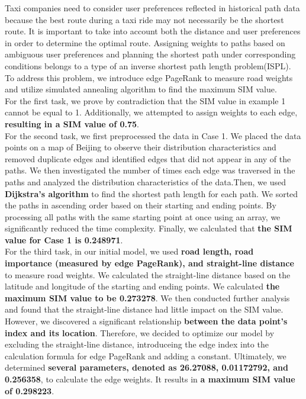 \documentclass[12pt]{article}
\begin{document}
\indent Taxi companies need to consider user preferences reflected in historical path data because the best route during a taxi ride may not necessarily be the shortest route. It is important to take into account both the distance and user preferences in order to determine the optimal route. Assigning weights to paths based on ambiguous user preferences and planning the shortest path under corresponding conditions belongs to a type of an inverse shortest path length problem(ISPL). To address this problem, we introduce edge PageRank to measure road weights and utilize simulated annealing algorithm to find the maximum SIM value.\\
\indent For the first task, we prove by contradiction that the SIM value in example 1 cannot be equal to 1. Additionally, we attempted to assign weights to each edge, \textbf{resulting in a SIM value of 0.75}.\\
\indent For the second task, we first preprocessed the data in Case 1. We placed the data points on a map of Beijing to observe their distribution characteristics and removed duplicate edges and identified edges that did not appear in any of the paths. We then investigated the number of times each edge was traversed in the paths and analyzed the distribution characteristics of the data.Then, we used \textbf{Dijkstra's algorithm} to find the shortest path length for each path. We sorted the paths in ascending order based on their starting and ending points. By processing all paths with the same starting point at once using an array, we significantly reduced the time complexity. Finally, we calculated that \textbf{the SIM value for Case 1 is 0.248971}.\\
\indent For the third task, in our initial model, we used \textbf{road length, road importance (measured by edge PageRank), and straight-line distance} to measure road weights. We calculated the straight-line distance based on the latitude and longitude of the starting and ending points. We calculated \textbf{the maximum SIM value to be 0.273278}. We then conducted further analysis and found that the straight-line distance had little impact on the SIM value. However, we discovered a significant relationship \textbf{between the data point's index and its location}. Therefore, we decided to optimize our model by excluding the straight-line distance, introduceing the edge index into the calculation formula for edge PageRank and adding a constant. Ultimately, we determined \textbf{several parameters, denoted as 26.27088, 0.01172792, and 0.256358}, to calculate the edge weights. It results in \textbf{a maximum SIM value of 0.298223}.\\
\end{document}
